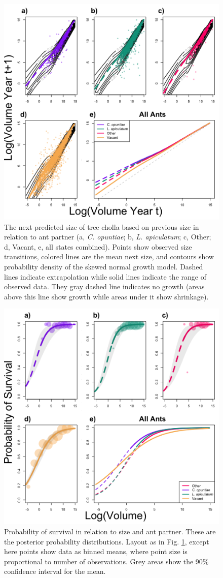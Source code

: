 \documentclass[11pt]{article}
\begin{document}
\begin{figure}[H]
	\includegraphics[width = 0.75\linewidth]{Figures/grow_contour_v2.png}
	\caption{The next predicted size of tree cholla based on previous size in relation to ant partner (a, \textit{C. opuntiae}; b, \textit{L. apiculatum}; c, Other; d, Vacant, e, all states combined). Points show observed size transitions, colored lines are the mean next size, and contours show probability density of the skewed normal growth model.  
	Dashed lines indicate extrapolation while solid lines indicate the range of observed data.
	They gray dashed line indicates no growth (areas above this line show growth while areas under it show shrinkage).}
	\label{fig:Grow}
\end{figure}

\begin{figure}[H]
\includegraphics[width=0.75\linewidth]{Figures/survival_plot.png}
\caption{Probability of survival in relation to size and ant partner. These are the posterior probability distributions. Layout as in Fig. \ref{fig:Grow}, except here points show data as binned means, where point size is proportional to number of observations. Grey areas show the 90\% confidence interval for the mean.}
\label{fig:Surv}
\end{figure}
\end{document}
